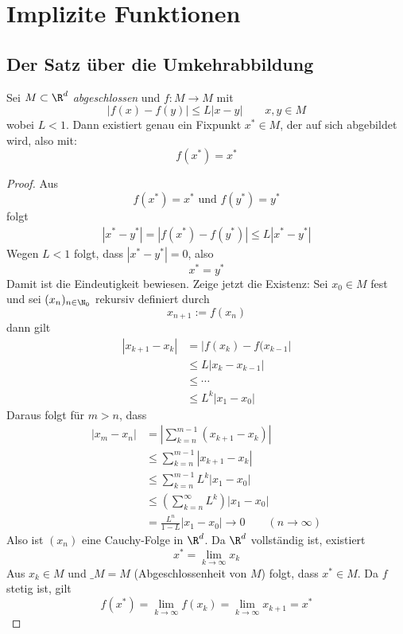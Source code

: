 \documentclass[a4paper,10pt]{scrartcl}
\begin{document}
\section{Implizite Funktionen}

\subsection{Der Satz über die Umkehrabbildung}

\begin{st}
\label{14.1}
Sei $M\subset \R^d$ \emph{abgeschlossen} und $f:M\to M$ mit
\[
|f(x)-f(y)| \le L|x-y|	\qquad x,y\in M
\]
wobei $L<1$.
Dann existiert genau ein Fixpunkt $x^*\in M$, der auf sich abgebildet wird, also mit:
\[
f(x^*) = x^*
\]
\begin{proof}
Aus
\[
f(x^*) = x^* \text{ und } f(y^*) = y^*
\]
folgt
\begin{align*}
|x^*-y^*| = |f(x^*)-f(y^*)| \le L|x^* - y^*|
\end{align*}
Wegen $L<1$ folgt, dass $|x^*-y^*|=0$, also
\[
x^*=y^*
\]
Damit ist die Eindeutigkeit bewiesen.
Zeige jetzt die Existenz:
Sei $x_0\in M$ fest und sei $(x_n)_{n\in \N_0}$ rekursiv definiert durch
\[
x_{n+1} := f(x_n)
\]
dann gilt
\begin{align*}
|x_{k+1}-x_k| &= |f(x_k)-f(x_{k-1}|\\
&\le L|x_k -x_{k-1}|\\
&\le \cdots \\
&\le L^k|x_1-x_0|
\end{align*}
Daraus folgt für $m>n$, dass
\begin{align*}
|x_m-x_n| &= \left| \sum_{k=n}^{m-1}(x_{k+1}-x_k)\right|\\
&\le \sum_{k=n}^{m-1}|x_{k+1}-x_k|\\
&\le \sum_{k=n}^{m-1}L^k|x_1-x_0|\\
&\le \left(\sum_{k=n}^{\infty}L^k\right)|x_1-x_0|\\
&= \frac {L^n}{1-L}|x_1-x_0| \to 0 \qquad (n\to \infty)
\end{align*}
Also ist $(x_n)$ eine Cauchy-Folge in $\R^d$.
Da $\R^d$ vollständig ist, existiert
\[
x^* = \lim_{k\to \infty}x_k
\]
Aus $x_k\in M$ und $\_{M}=M$ (Abgeschlossenheit von $M$) folgt, dass $x^*\in M$.
Da $f$ stetig ist, gilt
\[
f(x^*) = \lim_{k\to \infty}f(x_k) =\lim_{k\to \infty}x_{k+1} = x^*
\]
\end{proof}
\end{st}
\end{document}

